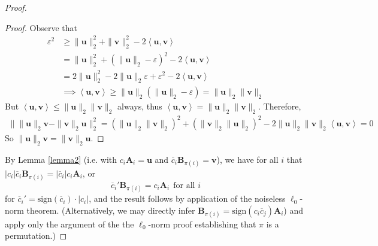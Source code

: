 \documentclass[journal, onecolumn]{IEEEtran}
\begin{document}
\begin{proof}
\begin{proof}
Observe that 
\begin{align}
\varepsilon^2 &\geq \|\mathbf{u}\|_2^2 +  \|\mathbf{v}\|_2^2 - 2 \left<\mathbf{u}, \mathbf{v}\right> \\
&=  \|\mathbf{u}\|_2^2 + \left( \|\mathbf{u}\|_2 - \varepsilon \right)^2 - 2 \left<\mathbf{u}, \mathbf{v}\right> \\
&=  2 \|\mathbf{u}\|_2^2 - 2\|\mathbf{u}\|_2 \varepsilon + \varepsilon^2 - 2 \left<\mathbf{u}, \mathbf{v}\right> \\
&\implies \left<\mathbf{u}, \mathbf{v}\right> \geq \|\mathbf{u}\|_2 \left( \|\mathbf{u}\|_2 - \varepsilon \right)
= \|\mathbf{u}\|_2 \|\mathbf{v}\|_2
\end{align}
But $\left<\mathbf{u}, \mathbf{v}\right>  \leq \|\mathbf{u}\|_2 \|\mathbf{v}\|_2$ always, thus $\left<\mathbf{u}, \mathbf{v}\right>  = \|\mathbf{u}\|_2 \|\mathbf{v}\|_2$. Therefore, 
\begin{align}
\| \|\mathbf{u}\|_2\mathbf{v} - \|\mathbf{v}\|_2\mathbf{u} \|_2^2 
= \left( \|\mathbf{u}\|_2 \|\mathbf{v}\|_2 \right)^2 +  \left( \|\mathbf{v}\|_2 \|\mathbf{u}\|_2 \right)^2 - 2  \|\mathbf{u}\|_2 \|\mathbf{v}\|_2 \left<\mathbf{u}, \mathbf{v}\right>
= 0
\end{align}
So $\|\mathbf{u}\|_2\mathbf{v} = \|\mathbf{v}\|_2\mathbf{u} $.
\end{proof}
By Lemma \ref{lemma2} (i.e. with $c_i\mathbf{A}_i = \mathbf{u}$ and $\overline c_i \mathbf{B}_{\pi(i)} = \mathbf{v}$), we have for all $i$ that $|c_i| \overline c_i \mathbf{B}_{\pi(i)} = |\overline c_i| c_i \mathbf{A}_i$, or 
\begin{equation}
\overline c_i' \mathbf{B}_{\pi(i)} = c_i \mathbf{A}_i \ \ \text{for all $i$}
\end{equation}
for $\overline c_i' = \text{sign}(\overline c_i) \cdot |c_i|$, and the result follows by application of the noiseless $\ell_0$-norm theorem. (Alternatively, we may directly infer $\mathbf{B}_{\pi(i)} = \text{sign}(c_i \overline c_j) \mathbf{A}_i$) and apply only the argument of the the $\ell_0$-norm proof establishing that $\pi$ is a permutation.)
\end{proof}
\end{document}
